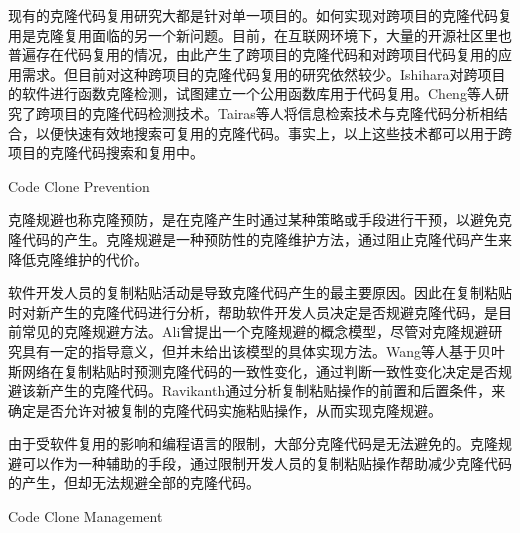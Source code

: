 
现有的克隆代码复用研究大都是针对单一项目的。如何实现对跨项目的克隆代码复用是克隆复用面临的另一个新问题。目前，在互联网环境下，大量的开源社区里也普遍存在代码复用的情况，由此产生了跨项目的克隆代码和对跨项目代码复用的应用需求。但目前对这种跨项目的克隆代码复用的研究依然较少。Ishihara对跨项目的软件进行函数克隆检测，试图建立一个公用函数库用于代码复用\cite{ishihara2012inter}。Cheng等人研究了跨项目的克隆代码检测技术\cite{cheng2016feasibility}。Tairas等人将信息检索技术与克隆代码分析相结合，以便快速有效地搜索可复用的克隆代码\cite{tairas2009information}。事实上，以上这些技术都可以用于跨项目的克隆代码搜索和复用中。

{Code Clone Prevention}

克隆规避也称克隆预防，是在克隆产生时通过某种策略或手段进行干预，以避免克隆代码的产生。克隆规避是一种预防性的克隆维护方法，通过阻止克隆代码产生来降低克隆维护的代价。

软件开发人员的复制粘贴活动是导致克隆代码产生的最主要原因。因此在复制粘贴时对新产生的克隆代码进行分析，帮助软件开发人员决定是否规避克隆代码，是目前常见的克隆规避方法。Ali曾提出一个克隆规避的概念模型\cite{ali2013enhancing}，尽管对克隆规避研究具有一定的指导意义，但并未给出该模型的具体实现方法。Wang等人基于贝叶斯网络在复制粘贴时预测克隆代码的一致性变化，通过判断一致性变化决定是否规避该新产生的克隆代码\cite{wang2012can}。Ravikanth通过分析复制粘贴操作的前置和后置条件，来确定是否允许对被复制的克隆代码实施粘贴操作，从而实现克隆规避\cite{venkatasubramanyam2012method}。

由于受软件复用的影响和编程语言的限制，大部分克隆代码是无法避免的。克隆规避可以作为一种辅助的手段，通过限制开发人员的复制粘贴操作帮助减少克隆代码的产生，但却无法规避全部的克隆代码。%

{Code Clone Management}


